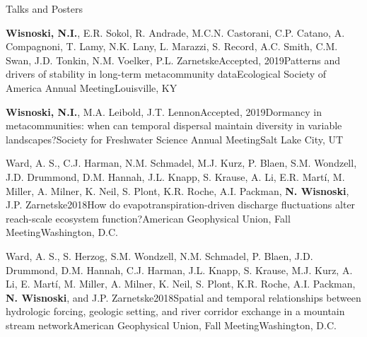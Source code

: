 \documentclass{resume} %
\begin{document}
% 
%  
%   
%   
% 
% 
\begin{rhangSection}{Talks and Posters}
  
    \begin{Presentation}{{\bf Wisnoski, N.I.}, E.R. Sokol, R. Andrade, M.C.N. Castorani, C.P. Catano, A. Compagnoni, T. Lamy, N.K. Lany, L. Marazzi, S. Record, A.C. Smith, C.M. Swan, J.D. Tonkin, N.M. Voelker, P.L. Zarnetske}{Accepted, 2019}{Patterns and drivers of stability in long-term metacommunity data}{Ecological Society of America Annual Meeting}{Louisville, KY}
  \end{Presentation}
  
   \begin{Presentation}{{\bf Wisnoski, N.I.}, M.A. Leibold, J.T. Lennon}{Accepted, 2019}{Dormancy in metacommunities: when can temporal dispersal maintain diversity in variable landscapes?}{Society for Freshwater Science Annual Meeting}{Salt Lake City, UT}
  \end{Presentation}
  
  \begin{Presentation}{Ward, A. S., C.J. Harman, N.M. Schmadel, M.J. Kurz, P. Blaen, S.M. Wondzell, J.D. Drummond, D.M. Hannah, J.L. Knapp, S. Krause, A. Li, E.R. Martí, M. Miller, A. Milner, K. Neil, S. Plont, K.R. Roche, A.I. Packman, {\bf N. Wisnoski}, J.P. Zarnetske}{2018}{How do evapotranspiration-driven discharge fluctuations alter reach-scale ecosystem function?}{American Geophysical Union, Fall Meeting}{Washington, D.C.}
  \end{Presentation}
  
   \begin{Presentation}{Ward, A. S., S. Herzog, S.M. Wondzell, N.M. Schmadel, P. Blaen, J.D. Drummond, D.M. Hannah, C.J. Harman, J.L. Knapp, S. Krause, M.J. Kurz, A. Li, E. Martí, M. Miller, A. Milner, K. Neil, S. Plont, K.R. Roche, A.I. Packman, {\bf N. Wisnoski}, and J.P. Zarnetske}{2018}{Spatial and temporal relationships between hydrologic forcing, geologic setting, and river corridor exchange in a mountain stream network}{American Geophysical Union, Fall Meeting}{Washington, D.C.}
  \end{Presentation}
  

\end{rhangSection}
\end{document}
